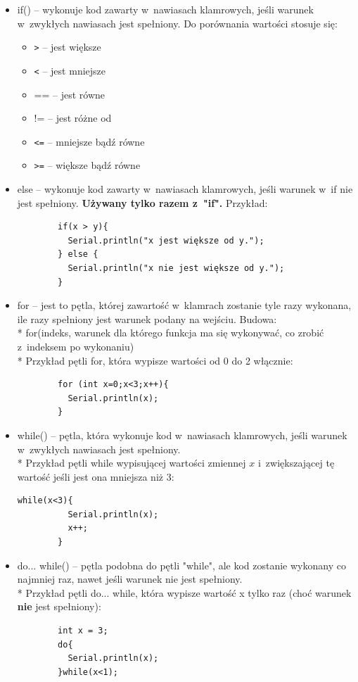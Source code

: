 \documentclass[a4paper,12pt, twoside]{article}
\begin{document}
	\begin{itemize}
		\item if(){} -- wykonuje kod zawarty w~nawiasach klamrowych, jeśli warunek w~zwykłych nawiasach jest spełniony. Do porównania wartości stosuje się:
			\begin{itemize}
				\item \verb|>| -- jest większe
				\item \verb|<|  -- jest mniejsze
				\item == -- jest równe
				\item != -- jest różne od
				\item \verb|<=| -- mniejsze bądź równe
				\item \verb|>=| -- większe bądź równe
			\end{itemize}
		\item else -- wykonuje kod zawarty w~nawiasach klamrowych, jeśli warunek w~if nie jest spełniony. \textbf{Używany tylko razem z~"if".} Przykład:
		\begin{verbatim}
		if(x > y){
		  Serial.println("x jest większe od y.");
		} else {
		  Serial.println("x nie jest większe od y.");
		}
		\end{verbatim}
		\item for -- jest to pętla, której zawartość w~klamrach zostanie tyle razy wykonana, ile razy spełniony jest warunek podany na wejściu. Budowa:\\*
		for(indeks, warunek dla którego funkcja ma się wykonywać, co zrobić z~indeksem po wykonaniu){}\\*
		Przykład pętli for, która wypisze wartości od 0 do 2 włącznie:
		\begin{verbatim}
		for (int x=0;x<3;x++){
		  Serial.println(x);
		}
		\end{verbatim}
		\item while() -- pętla, która wykonuje kod w~nawiasach klamrowych, jeśli warunek w~zwykłych nawiasach jest spełniony.\\*
		Przykład pętli while wypisującej wartości zmiennej $x$ i~zwiększającej tę wartość jeśli jest ona mniejsza niż 3:
		\begin{verbatim}while(x<3){
		  Serial.println(x);
		  x++;
		}
		\end{verbatim}
		\item do... while() -- pętla podobna do pętli "while", ale kod zostanie wykonany co najmniej raz, nawet jeśli warunek nie jest spełniony. \\*
		Przykład pętli do... while, która wypisze wartość x tylko raz (choć warunek \textbf{nie} jest spełniony):
		\begin {verbatim}
		int x = 3;
		do{
		  Serial.println(x);
		}while(x<1);
		\end{verbatim}
		
	\end{itemize}
\end{document}
